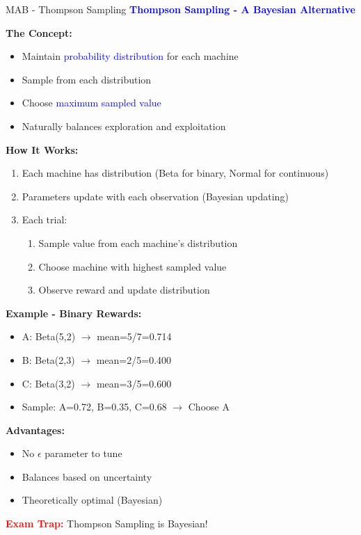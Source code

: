 \documentclass[8pt]{beamer}
\begin{document}
\begin{frame}{MAB - Thompson Sampling}
\fontsize{6.5}{7.5}\selectfont
\textcolor{blue}{\textbf{Thompson Sampling - A Bayesian Alternative}}

\textbf{The Concept:}
\begin{itemize}
\item Maintain \textcolor{blue}{probability distribution} for each machine
\item Sample from each distribution
\item Choose \textcolor{blue}{maximum sampled value}
\item Naturally balances exploration and exploitation
\end{itemize}

\textbf{How It Works:}
\begin{enumerate}
\item Each machine has distribution (Beta for binary, Normal for continuous)
\item Parameters update with each observation (Bayesian updating)
\item Each trial:
\begin{enumerate}
\item Sample value from each machine's distribution
\item Choose machine with highest sampled value
\item Observe reward and update distribution
\end{enumerate}
\end{enumerate}

\textbf{Example - Binary Rewards:}
\begin{itemize}
\item A: Beta(5,2) $\rightarrow$ mean=5/7=0.714
\item B: Beta(2,3) $\rightarrow$ mean=2/5=0.400
\item C: Beta(3,2) $\rightarrow$ mean=3/5=0.600
\item Sample: A=0.72, B=0.35, C=0.68 $\rightarrow$ Choose A
\end{itemize}

\textbf{Advantages:}
\begin{itemize}
\item No $\epsilon$ parameter to tune
\item Balances based on uncertainty
\item Theoretically optimal (Bayesian)
\end{itemize}

\textcolor{red}{\textbf{Exam Trap:}} Thompson Sampling is Bayesian!
\end{frame}
\end{document}
